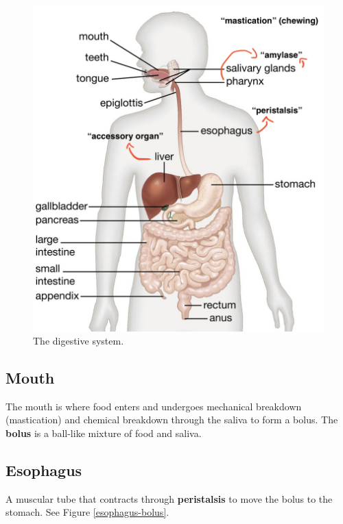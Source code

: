 \documentclass[12pt]{report}
\begin{document}
\begin{figure}[H]
\centering
    \includegraphics[width=\textwidth]{../figures/digestive system}
    \caption{The digestive system.}
    \label{fig:digestive-system}
\end{figure}

\subsection{Mouth}
\begin{definition}[Mouth]
    The mouth is where food enters and undergoes mechanical breakdown (mastication) and chemical breakdown through the saliva to form a bolus. The \textbf{bolus} is a ball-like mixture of food and saliva.
\end{definition}

\subsection{Esophagus}
\begin{definition}[Esophagus]
    A muscular tube that contracts through \textbf{peristalsis} to move the bolus to the stomach. See Figure \ref{esophagus-bolus}.
\end{definition}
\end{document}
